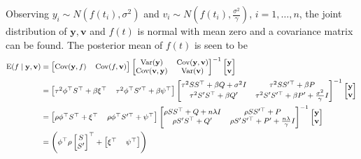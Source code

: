 Observing $y_i\sim N\left(f (t_i),\sigma^2\right)$ and $v_i\sim N\left(f (t_i),\frac{\sigma^2}{\gamma}\right)$, $i=1,\ldots,n$, the joint distribution of $\mathbf{y},\mathbf{v}$ and $f(t)$ is normal with mean zero and a covariance matrix can be found. The posterior mean of $f(t)$ is seen to be 
\begin{align}\label{GPrhoeq}\footnotesize
\begin{split}
\E (f \mid  \mathbf{\mathbf{y}},\mathbf{v}) & =
\begin{bmatrix}
\Cov (\mathbf{y},f) & \Cov (f,\mathbf{\mathbf{v}})
\end{bmatrix}\begin{bmatrix}
\Var(\mathbf{y}) & \Cov(\mathbf{y},\mathbf{v})\\
\Cov(\mathbf{v},\mathbf{y}) & \Var(\mathbf{v})
\end{bmatrix}^{-1}\begin{bmatrix}
\mathbf{y}\\\mathbf{v}
\end{bmatrix}\\
&=
\begin{bmatrix}
\tau^2 \phi^\top S^\top+\beta \xi^\top & \tau^2  \phi^\top S'^\top+\beta \psi^\top 
\end{bmatrix}\begin{bmatrix}
\tau^2 SS^\top+\beta Q+\sigma^2 I& \tau^2 SS'^\top+\beta P\\
\tau^2 S'S^\top+\beta Q'& \tau^2 S'S'^\top+\beta P'+\frac{\sigma^2}{\gamma}I
\end{bmatrix}^{-1}\begin{bmatrix}
\mathbf{y}\\\mathbf{v}
\end{bmatrix}\\
&=
\begin{bmatrix}
\rho\phi^\top S^\top+ \xi^\top & \rho\phi^\top S'^\top+\psi^\top
\end{bmatrix}\begin{bmatrix}
\rho SS^\top+Q+n\lambda I& \rho SS'^\top+P\\
\rho S'S^\top+Q'& \rho S'S'^\top+P'+\frac{n\lambda}{\gamma}I
\end{bmatrix}^{-1}\begin{bmatrix}
\mathbf{y}\\\mathbf{v}
\end{bmatrix}\\
&=\left(\phi^\top \rho 
\begin{bmatrix} S\\ S' \end{bmatrix}^\top + \begin{bmatrix} \xi^\top & \psi^\top\end{bmatrix}\right)

\end{split}
\end{align}
